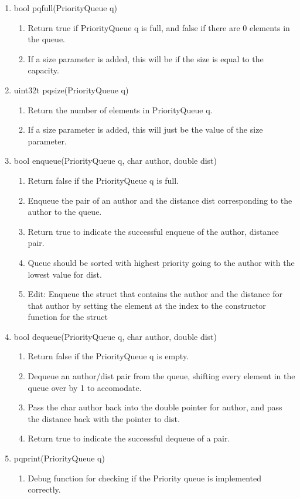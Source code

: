 \documentclass[11pt]{article}
\begin{document}
\begin{enumerate}
\item bool pqfull(PriorityQueue q)
	\begin{enumerate}
	\item Return true if PriorityQueue q is full, and false if there are 0 elements in the queue.
	\item If a size parameter is added, this will be if the size is equal to the capacity.
	\end{enumerate}
\item uint32t pqsize(PriorityQueue q)
	\begin{enumerate}
	\item Return the number of elements in PriorityQueue q.
	\item If a size parameter is added, this will just be the value of the size parameter.
	\end{enumerate}
\item bool enqueue(PriorityQueue q, char author, double dist)
	\begin{enumerate}
	\item Return false if the PriorityQueue q is full.
	\item Enqueue the pair of an author and the distance dist corresponding to the author to the queue.
	\item Return true to indicate the successful enqueue of the author, distance pair.
	\item Queue should be sorted with highest priority going to the author with the lowest value for dist.
	\item Edit: Enqueue the struct that contains the author and the distance for that author by setting the element at the index to the constructor function for the struct
	\end{enumerate}
\item bool dequeue(PriorityQueue q, char author, double dist)
	\begin{enumerate}
	\item Return false if the PriorityQueue q is empty.
	\item Dequeue an author/dist pair from the queue, shifting every element in the queue over by 1 to accomodate.
	\item Pass the char author back into the double pointer for author, and pass the distance back with the pointer to dist.
	\item Return true to indicate the successful dequeue of a pair.
	\end{enumerate}
\item pqprint(PriorityQueue q)
	\begin{enumerate}
	\item Debug function for checking if the Priority queue is implemented correctly.
	\end{enumerate}
\end{enumerate}
\end{document}
